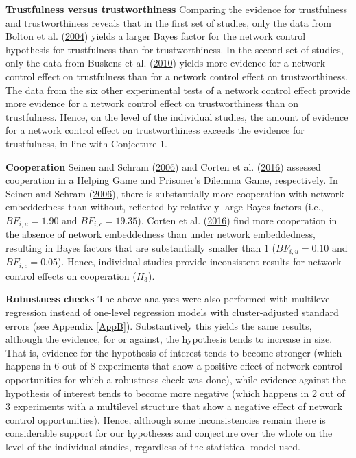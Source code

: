 \documentclass[
  11pt,
]{article}
\begin{document}
\textbf{Trustfulness versus trustworthiness} \hspace{8pt} Comparing the evidence for trustfulness and trustworthiness reveals that in the first set of studies, only the data from Bolton et al. (\protect\hyperlink{ref-bolton_electronic_2004}{2004}) yields a larger Bayes factor for the network control hypothesis for trustfulness than for trustworthiness.
In the second set of studies, only the data from Buskens et al. (\protect\hyperlink{ref-buskens_raub_veer_triads_2010}{2010}) yields more evidence for a network control effect on trustfulness than for a network control effect on trustworthiness.
The data from the six other experimental tests of a network control effect provide more evidence for a network control effect on trustworthiness than on trustfulness.
Hence, on the level of the individual studies, the amount of evidence for a network control effect on trustworthiness exceeds the evidence for trustfulness, in line with Conjecture 1.

\textbf{Cooperation} \hspace{8pt} Seinen and Schram (\protect\hyperlink{ref-seinen_schram_social_2006}{2006}) and Corten et al. (\protect\hyperlink{ref-corten_etal_reputation_2016}{2016}) assessed cooperation in a Helping Game and Prisoner's Dilemma Game, respectively.
In Seinen and Schram (\protect\hyperlink{ref-seinen_schram_social_2006}{2006}), there is substantially more cooperation with network embeddedness than without, reflected by relatively large Bayes factors (i.e., \(BF_{i,u} = 1.90\) and \(BF_{i,c} = 19.35\)).
Corten et al. (\protect\hyperlink{ref-corten_etal_reputation_2016}{2016}) find more cooperation in the absence of network embeddedness than under network embeddedness, resulting in Bayes factors that are substantially smaller than \(1\) (\(BF_{i,u} = 0.10\) and \(BF_{i,c} = 0.05\)).
Hence, individual studies provide inconsistent results for network control effects on cooperation (\(H_3\)).

\textbf{Robustness checks} \hspace{8pt} The above analyses were also performed with multilevel regression instead of one-level regression models with cluster-adjusted standard errors (see Appendix \ref{AppB}).
Substantively this yields the same results, although the evidence, for or against, the hypothesis tends to increase in size.
That is, evidence for the hypothesis of interest tends to become stronger (which happens in 6 out of 8 experiments that show a positive effect of network control opportunities for which a robustness check was done), while evidence against the hypothesis of interest tends to become more negative (which happens in 2 out of 3 experiments with a multilevel structure that show a negative effect of network control opportunities).
Hence, although some inconsistencies remain there is considerable support for our hypotheses and conjecture over the whole on the level of the individual studies, regardless of the statistical model used.
\end{document}
